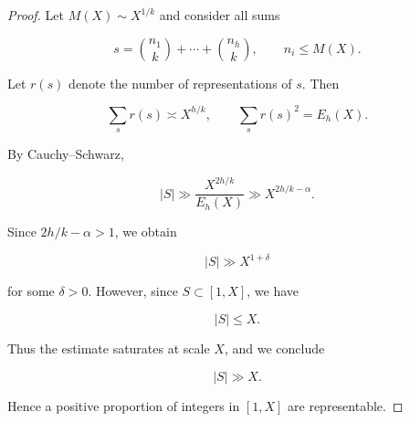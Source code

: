 \documentclass[10pt,a4paper]{amsart}
\begin{document}
\begin{proof}
Let $M(X) \sim X^{1/k}$ and consider all sums

\[
s = \binom{n_1}{k} + \cdots + \binom{n_h}{k}, \qquad n_i \le M(X).
\]

Let $r(s)$ denote the number of representations of $s$. Then

\[
\sum_s r(s) \asymp X^{h/k}, \qquad \sum_s r(s)^2 = E_h(X).
\]

By Cauchy--Schwarz,

\[
|S| \gg \frac{X^{2h/k}}{E_h(X)} \gg X^{2h/k - \alpha}.
\]

Since $2h/k - \alpha > 1$, we obtain

\[
|S| \gg X^{1+\delta}
\]

for some $\delta > 0$. However, since $S \subset [1,X]$, we have

\[
|S| \le X.
\]

Thus the estimate saturates at scale $X$, and we conclude

\[
|S| \gg X.
\]

Hence a positive proportion of integers in $[1,X]$ are representable.
\end{proof}
\end{document}
